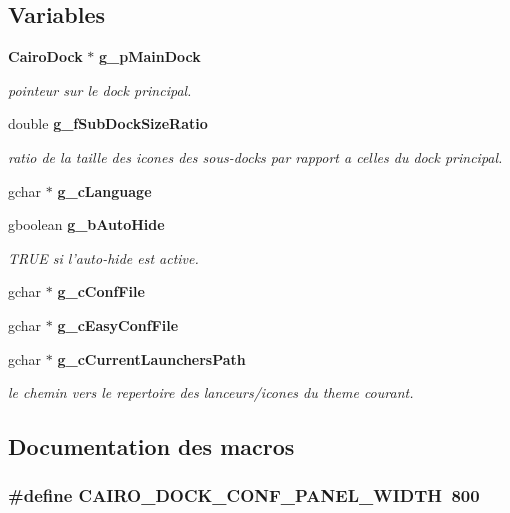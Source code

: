 \subsection*{Variables}
\begin{CompactItemize}
\item 
{\bf Cairo\-Dock} $\ast$ {\bf g\_\-p\-Main\-Dock}
\begin{CompactList}\small\item\em pointeur sur le dock principal. \item\end{CompactList}\item 
double {\bf g\_\-f\-Sub\-Dock\-Size\-Ratio}
\begin{CompactList}\small\item\em ratio de la taille des icones des sous-docks par rapport a celles du dock principal. \item\end{CompactList}\item 
gchar $\ast$ {\bf g\_\-c\-Language}
\item 
gboolean {\bf g\_\-b\-Auto\-Hide}
\begin{CompactList}\small\item\em TRUE si l'auto-hide est active. \item\end{CompactList}\item 
gchar $\ast$ {\bf g\_\-c\-Conf\-File}
\item 
gchar $\ast$ {\bf g\_\-c\-Easy\-Conf\-File}
\item 
gchar $\ast$ {\bf g\_\-c\-Current\-Launchers\-Path}
\begin{CompactList}\small\item\em le chemin vers le repertoire des lanceurs/icones du theme courant. \item\end{CompactList}\end{CompactItemize}


\subsection{Documentation des macros}
\subsubsection{\setlength{\rightskip}{0pt plus 5cm}\#define CAIRO\_\-DOCK\_\-CONF\_\-PANEL\_\-WIDTH~800}\label{cairo-dock-menu_8c_4b102c79eee6723861b950368875b10f}


